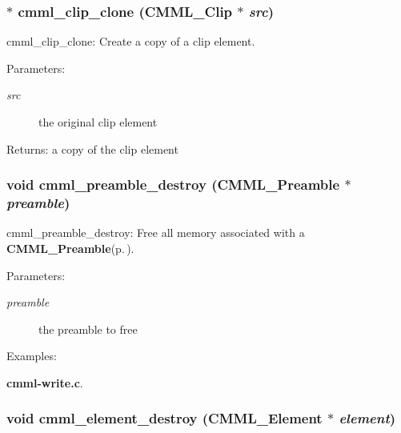 \subsubsection{$\ast$ cmml\_\-clip\_\-clone ({\bf CMML\_\-Clip} $\ast$ {\em src})}\label{cmml_8h_a66}


cmml\_\-clip\_\-clone: Create a copy of a clip element.

\begin{Desc}
\item[Parameters:]
\begin{description}
\item[{\em src}]the original clip element\end{description}
\end{Desc}
\begin{Desc}
\item[Returns:]a copy of the clip element \end{Desc}
\subsubsection{\setlength{\rightskip}{0pt plus 5cm}void cmml\_\-preamble\_\-destroy ({\bf CMML\_\-Preamble} $\ast$ {\em preamble})}\label{cmml_8h_a67}


cmml\_\-preamble\_\-destroy: Free all memory associated with a {\bf CMML\_\-Preamble}{\rm (p.\,\pageref{structCMML__Preamble})}.

\begin{Desc}
\item[Parameters:]
\begin{description}
\item[{\em preamble}]the preamble to free \end{description}
\end{Desc}
\begin{Desc}
\item[Examples: ]\par
{\bf cmml-write.c}.\end{Desc}
\subsubsection{\setlength{\rightskip}{0pt plus 5cm}void cmml\_\-element\_\-destroy ({\bf CMML\_\-Element} $\ast$ {\em element})}\label{cmml_8h_a68}


